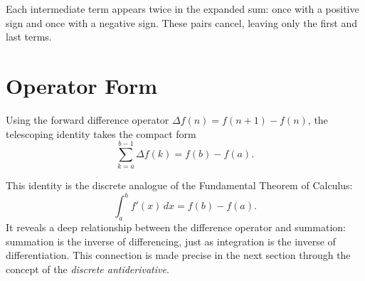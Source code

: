 \begin{remark*}[Intuition]
Each intermediate term appears twice in the expanded sum: once with a
positive sign and once with a negative sign. These pairs cancel, leaving
only the first and last terms.
\end{remark*}

\section*{Operator Form}

Using the forward difference operator \(\Delta f(n) = f(n+1) - f(n)\),
the telescoping identity takes the compact form
\[
\sum_{k=a}^{b-1} \Delta f(k) = f(b) - f(a).
\]

\begin{remark*}
This identity is the discrete analogue of the Fundamental Theorem of
Calculus:
\[
\int_a^b f'(x)\,dx = f(b)-f(a).
\]
It reveals a deep relationship between the difference operator and
summation: summation is the inverse of differencing, just as integration
is the inverse of differentiation. This connection is made precise in the
next section through the concept of the \emph{discrete antiderivative}.
\end{remark*}

